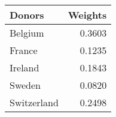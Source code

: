 \begin{tabular}{lr}
\toprule
     Donors &  Weights \\
\midrule
    Belgium &   0.3603 \\
     France &   0.1235 \\
    Ireland &   0.1843 \\
     Sweden &   0.0820 \\
Switzerland &   0.2498 \\
\bottomrule
\end{tabular}
